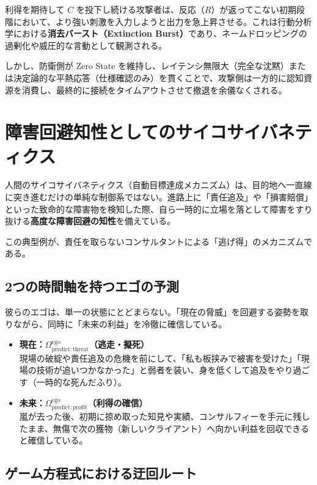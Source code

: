 利得を期待して $C$ を投下し続ける攻撃者は、反応（$R$）が返ってこない初期段階において、より強い刺激を入力しようと出力を急上昇させる。これは行動分析学における\textbf{消去バースト（Extinction Burst）}であり、ネームドロッピングの過剰化や威圧的な言動として観測される。

しかし、防衛側が Zero State を維持し、レイテンシ無限大（完全な沈黙）または決定論的な平熱応答（仕様確認のみ）を貫くことで、攻撃側は一方的に認知資源を消費し、最終的に接続をタイムアウトさせて撤退を余儀なくされる。

\section{障害回避知性としてのサイコサイバネティクス}

人間のサイコサイバネティクス（自動目標達成メカニズム）は、目的地へ一直線に突き進むだけの単純な制御系ではない。進路上に「責任追及」や「損害賠償」といった致命的な障害物を検知した際、自ら一時的に立場を落として障害をすり抜ける\textbf{高度な障害回避の知性}を備えている。

この典型例が、責任を取らないコンサルタントによる「逃げ得」のメカニズムである。

\subsection{2つの時間軸を持つエゴの予測}

彼らのエゴは、単一の状態にとどまらない。「現在の脅威」を回避する姿勢を取りながら、同時に「未来の利益」を冷徹に確信している。

\begin{itemize}
    \item \textbf{現在：$\Omega^{\mathrm{ego}}_{\mathrm{predict:threat}}$（逃走・擬死）}\\
    現場の破綻や責任追及の危機を前にして、「私も板挟みで被害を受けた」「現場の技術が追いつかなかった」と弱者を装い、身を低くして追及をやり過ごす（一時的な死んだふり）。
    
    \item \textbf{未来：$\Omega^{\mathrm{ego}}_{\mathrm{predict:profit}}$（利得の確信）}\\
    嵐が去った後、初期に掠め取った知見や実績、コンサルフィーを手元に残したまま、無傷で次の獲物（新しいクライアント）へ向かい利益を回収できると確信している。
\end{itemize}

\subsection{ゲーム方程式における迂回ルート}

